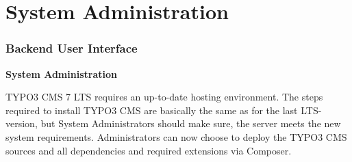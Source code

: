%

\section{System Administration}
\begin{frame}[fragile]
	\frametitle{Backend User Interface}

	\begin{center}\huge{\color{typo3darkgrey}\textbf{System Administration}}\end{center}

	TYPO3 CMS 7 LTS requires an up-to-date hosting environment.
	The steps required to install TYPO3 CMS are basically the same as for the last
	LTS-version, but System Administrators should make sure, the server meets the
	new system requirements.\newline
	Administrators can now choose to deploy the TYPO3 CMS sources and all dependencies
	and required extensions via Composer.

\end{frame}

